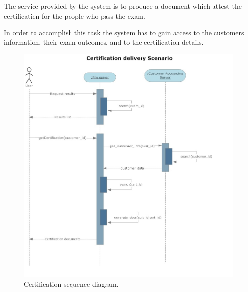 The service provided by the system is to produce a document which attest
the certification for the people who pass the exam.

In order to accomplish this task the system has to gain access to the
customers information, their exam outcomes, and to the certification
details.
 
\begin{figure}[H]
\begin{centering}
\includegraphics[scale=0.45]{assign3/sdraw/imgs/certification.jpg}
\caption{Certification sequence diagram.}
\label{3img:[sequence]certification}
\end{centering}
\end{figure}

